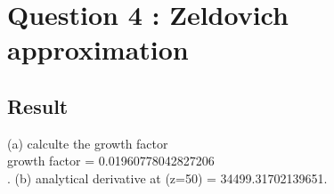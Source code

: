 \section{Question 4 : Zeldovich approximation}



\subsection{Result}
(a) calculte the growth factor\\
growth factor =  0.01960778042827206\\.
(b) analytical derivative at (z=50) =  34499.31702139651.
